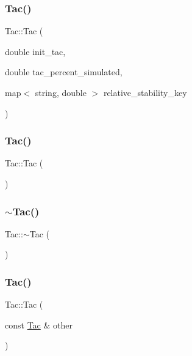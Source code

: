 \subsubsection{\texorpdfstring{Tac()}{Tac()}\hspace{0.1cm}{\footnotesize\ttfamily [1/3]}}
{\footnotesize\ttfamily Tac\+::\+Tac (\begin{DoxyParamCaption}\item[{double}]{init\+\_\+tac,  }\item[{double}]{tac\+\_\+percent\+\_\+simulated,  }\item[{map$<$ string, double $>$}]{relative\+\_\+stability\+\_\+key }\end{DoxyParamCaption})}

\mbox{\label{class_tac_a7c1be5c4d004559141c0b2fff40f33d7}} 
\subsubsection{\texorpdfstring{Tac()}{Tac()}\hspace{0.1cm}{\footnotesize\ttfamily [2/3]}}
{\footnotesize\ttfamily Tac\+::\+Tac (\begin{DoxyParamCaption}{ }\end{DoxyParamCaption})}

\mbox{\label{class_tac_aae7c1dd2aa942295c6daf8f5706b4e10}} 
\subsubsection{\texorpdfstring{$\sim$Tac()}{~Tac()}}
{\footnotesize\ttfamily Tac\+::$\sim$\+Tac (\begin{DoxyParamCaption}{ }\end{DoxyParamCaption})\hspace{0.3cm}{\ttfamily [virtual]}}

\mbox{\label{class_tac_a6770d4433928411a79f8e7ab6ea4f29f}} 
\subsubsection{\texorpdfstring{Tac()}{Tac()}\hspace{0.1cm}{\footnotesize\ttfamily [3/3]}}
{\footnotesize\ttfamily Tac\+::\+Tac (\begin{DoxyParamCaption}\item[{const \mbox{\hyperlink{class_tac}{Tac}} \&}]{other }\end{DoxyParamCaption})}



